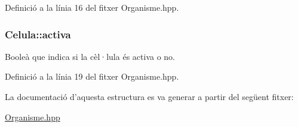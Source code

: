 Definició a la línia 16 del fitxer Organisme.\-hpp.

\hypertarget{struct_celula_ad9c2e6f0c72719aa73b472bb44434098}{
\subsubsection[{activa}]{\setlength{\rightskip}{0pt plus 5cm}Celula\-::activa}}\label{struct_celula_ad9c2e6f0c72719aa73b472bb44434098}


Booleà que indica si la cèl·lula és activa o no. 



Definició a la línia 19 del fitxer Organisme.\-hpp.



La documentació d'aquesta estructura es va generar a partir del següent fitxer\-:\begin{DoxyCompactItemize}
\item 
\hyperlink{_organisme_8hpp}{Organisme.\-hpp}\end{DoxyCompactItemize}
